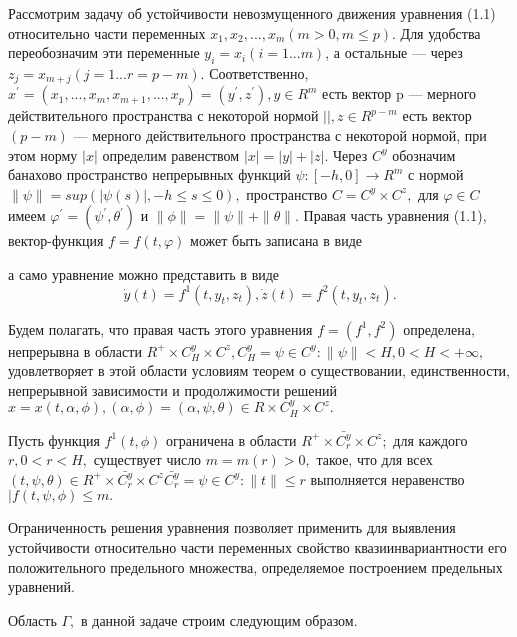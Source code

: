 	Рассмотрим задачу об устойчивости невозмущенного движения уравнения (1.1) относительно части переменных $x_1, x_2, ... , x_m (m > 0, m \le p).$ Для удобства переобозначим эти переменные $y_i = x_i (i = 1...m)$, а остальные --- через $z_j = x_{m+j} (j = 1...r = p - m).$ Соответственно, $x^{'} = (x_1, ... , x_m, x_{m+1}, ..., x_p) = (y^{'}, z^{'}), y \in R^m$ есть вектор p --- мерного действительного пространства с некоторой нормой $||, z \in R^{p-m}$ есть вектор $(p-m)$ --- мерного действительного пространства с некоторой нормой, при этом норму $|x|$ определим равенством $|x| = |y| + |z|.$ Через $C^y$ обозначим банахово пространство непрерывных функций $\psi : [-h, 0] \to R^m$ с нормой $\| \psi \| = sup(| \psi(s) |, -h \le s \le 0),$ пространство $C = C^y \times C^z,$ для $\varphi \in C$ имеем $\varphi^{'} = (\psi^{'}, \theta^{'})$ и $\| \phi \| = \| \psi \| + \| \theta \|.$ Правая часть уравнения (1.1), вектор-функция $f = f(t, \varphi)$ может быть записана в виде
	
	а само уравнение можно представить в виде 
	\begin{equation}
	\dot y(t) = f^1(t, y_t, z_t), \dot z(t) = f^2(t, y_t, z_t).
	\end{equation}
	
	Будем полагать, что правая часть этого уравнения $f = (f^1, f^2)$ определена, непрерывна в области $R^+ \times C^y_H \times C^z, C^y_H = {\psi \in C^y : \| \psi \| < H, 0 < H < +\infty}, $ удовлетворяет в этой области условиям теорем о существовании, единственности, непрерывной зависимости и продолжимости решений $x = x(t, \alpha, \phi), (\alpha, \phi) = (\alpha, \psi, \theta) \in R \times C^y_H \times C^z.$
	
	\begin{Ass}\label{AS1} Пусть функция $f^1(t, \phi)$ ограничена в области $R^+ \times \bar{C_r^y} \times C^z; $ для каждого $r, 0 < r < H,$ существует число $m = m(r) > 0,$ такое, что для всех $(t, \psi, \theta) \in R^+ \times \bar{C_r^y} \times C^z \bar{C_r^y} = {\psi \in C^y : \| t \| \le r}$ выполняется неравенство $| f(t, \psi, \phi) \le m .$
	\end{Ass}
	
	Ограниченность решения уравнения позволяет применить для выявления устойчивости относительно части переменных свойство квазиинвариантности его положительного предельного множества, определяемое построением предельных уравнений.
	
	Область $\Gamma, $ в данной задаче строим следующим образом. 
	
